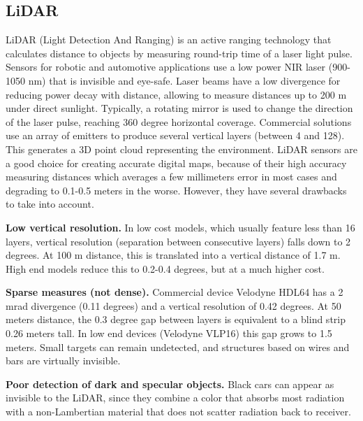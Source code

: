 \documentclass[journal]{IEEEtran}
\begin{document}
\subsection{LiDAR}
\label{sec:02-c-lidar}
LiDAR (Light Detection And Ranging) is an active ranging technology that 
calculates distance to objects by measuring round-trip time of a laser light 
pulse.
Sensors for robotic and automotive applications use a low power 
NIR laser (900-1050 nm) that is invisible and eye-safe. 
Laser beams have a low divergence for reducing power decay with distance,
allowing to measure distances up to 200 m under direct sunlight.
Typically, a rotating mirror is used to change the direction of the laser 
pulse, reaching 360 degree horizontal coverage. 
Commercial solutions use an array of 
emitters to produce several vertical layers (between 4 and 128). This generates
a 3D point cloud representing the environment.
LiDAR sensors are a good choice for creating accurate digital maps, because
of their high accuracy measuring distances which averages
a few millimeters error in most cases and degrading to 0.1-0.5 meters in the 
worse. %
However, they have several drawbacks to take into account.

\textbf{Low vertical resolution.} In low cost models, which usually feature 
less than 16 layers, vertical resolution (separation between consecutive
layers) falls down to 2 degrees. At 100 m distance, this is translated into 
a vertical distance of 1.7 m. High end models reduce this to 0.2-0.4 
degrees, but at a much higher cost.

\textbf{Sparse measures (not dense).} 
Commercial device Velodyne HDL64 has a 2 mrad divergence \cite{Glennie2010} 
(0.11 degrees) and a vertical resolution of 0.42 degrees. At 50 meters 
distance, the 0.3 degree gap between layers is equivalent to a blind strip
0.26 meters tall. In low end devices (Velodyne VLP16) this gap grows to 1.5
meters. Small targets can remain undetected, and structures based on
wires and bars are virtually invisible.

\textbf{Poor detection of dark and specular objects.} Black cars
can appear as invisible to the LiDAR, since they combine a color that
absorbs most radiation with a non-Lambertian material that does not scatter
radiation back to receiver.
\end{document}
